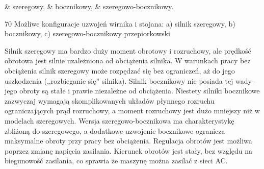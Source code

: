 \begin{easylist}
	& szeregowy,
	& bocznikowy,
	& szeregowo-bocznikowy.
\end{easylist}

		{70}
		{Możliwe konfiguracje uzwojeń wirnika i stojana: a) silnik szeregowy, b) bocznikowy, c) szeregowo-bocznikowy}
		{przepiorkowski}

Silnik szeregowy ma bardzo duży moment obrotowy i rozruchowy, ale prędkość obrotowa jest silnie uzależniona od obciążenia silnika. W warunkach pracy bez obciążenia silnik szeregowy może rozpędzać się bez ograniczeń, aż do jego uszkodzenia (,,rozbieganie się'' silnika). Silnik bocznikowy nie posiada tej wady-- jego obroty są stałe i prawie niezależne od obciążenia. Niestety silniki bocznikowe zazwyczaj wymagają skomplikowanych układów płynnego rozruchu ograniczających prąd rozruchowy, a moment rozruchowy jest dużo mniejszy niż w modelach szeregowych. Wersja szeregowo-bocznikowa ma charakterystykę zbliżoną do szeregowego, a dodatkowe uzwojenie bocznikowe ogranicza maksymalne obroty przy pracy bez obciążenia. Regulacja obrotów jest możliwa poprzez zmianę napięcia zasilania. Kierunek obrotów jest stały, bez względu na biegunowość zasilania, co sprawia że maszynę można zasilać z sieci AC.



